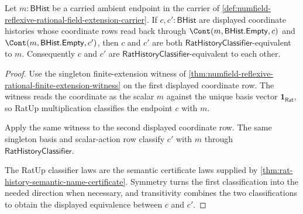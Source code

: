 \begin{theorem}
\label{thm:numfield-reflexive-coordinate-readback-determinacy}
Let $m:\mathsf{BHist}$ be a carried ambient endpoint in the carrier of
\autoref{def:numfield-reflexive-rational-field-extension-carrier}. If
$c,c':\mathsf{BHist}$ are displayed coordinate histories whose coordinate rows
read back through $\Cont(m,\mathsf{BHist.Empty},c)$ and
$\Cont(m,\mathsf{BHist.Empty},c')$, then $c$ and $c'$ are both
$\mathsf{RatHistoryClassifier}$-equivalent to $m$. Consequently $c$ and $c'$
are $\mathsf{RatHistoryClassifier}$-equivalent to each other.
\end{theorem}
\begin{proof}
Use the singleton finite-extension witness of
\autoref{thm:numfield-reflexive-rational-finite-extension-witness} on the first
displayed coordinate row. The witness reads the coordinate as the scalar $m$
against the unique basis vector $\mathbf{1}_{\mathsf{Rat}}$, so RatUp
multiplication classifies the endpoint $c$ with $m$.

Apply the same witness to the second displayed coordinate row. The same
singleton basis and scalar-action row classify $c'$ with $m$ through
$\mathsf{RatHistoryClassifier}$.

The RatUp classifier laws are the semantic certificate laws supplied by
\autoref{thm:rat-history-semantic-name-certificate}. Symmetry turns the first
classification into the needed direction when necessary, and transitivity
combines the two classifications to obtain the displayed equivalence between
$c$ and $c'$.
\end{proof}

